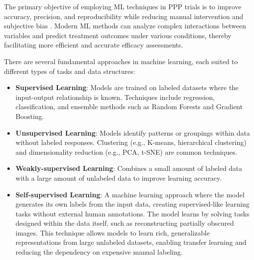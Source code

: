 \documentclass[12pt,a4paper,oneside]{report}
\begin{document}
The primary objective of employing ML techniques in PPP trials 
is to improve accuracy, precision, and reproducibility while reducing manual 
intervention and subjective bias \cite{bockVisualEstimatesFully2020}. Modern ML methods can analyze complex interactions 
between variables and predict treatment outcomes under various conditions, thereby 
facilitating more efficient and accurate efficacy assessments.

There are several fundamental approaches in machine learning, each suited to different 
types of tasks and data structures:

\begin{itemize}
    \item \textbf{Supervised Learning}: Models are trained on labeled datasets where 
    the input-output relationship is known. Techniques include regression, classification, 
    and ensemble methods such as Random Forests and Gradient Boosting.
    \item \textbf{Unsupervised Learning}: Models identify patterns or groupings within 
    data without labeled responses. Clustering (e.g., K-means, hierarchical clustering) 
    and dimensionality reduction (e.g., PCA, t-SNE) are common techniques.
    \item \textbf{Weakly-supervised Learning}: Combines a small amount of labeled data with 
    a large amount of unlabeled data to improve learning accuracy.
    \item \textbf{Self-supervised Learning}: A machine learning approach where the model
    generates its own labels from the input data, creating supervised-like learning
    tasks without external human annotations. The model learns by solving tasks
    designed within the data itself, such as
    reconstructing partially obscured images. This technique allows models to learn rich, generalizable
    representations from large unlabeled datasets, enabling transfer learning and
    reducing the dependency on expensive manual labeling.
\end{itemize}
\end{document}
